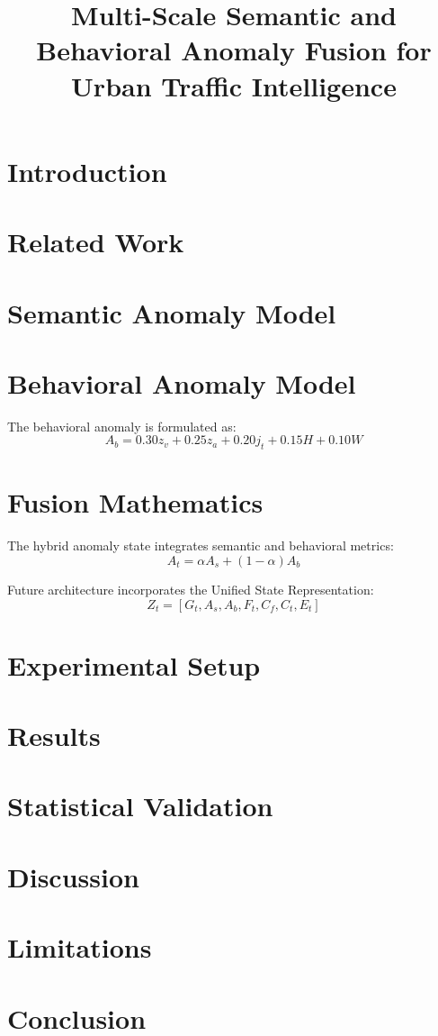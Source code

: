 \documentclass{article}
\title{Multi-Scale Semantic and Behavioral Anomaly Fusion for Urban Traffic Intelligence}
\begin{document}
\maketitle

\begin{abstract}
\end{abstract}

\section{Introduction}
\section{Related Work}

\section{Semantic Anomaly Model}
\section{Behavioral Anomaly Model}
The behavioral anomaly is formulated as:
$$A_b = 0.30z_v + 0.25z_a + 0.20j_t + 0.15H + 0.10W$$

\section{Fusion Mathematics}
The hybrid anomaly state integrates semantic and behavioral metrics:
$$A_t = \alpha A_s + (1-\alpha)A_b$$

Future architecture incorporates the Unified State Representation:
$$Z_t = [G_t, A_s, A_b, F_t, C_f, C_t, E_t]$$

\section{Experimental Setup}
\section{Results}
\section{Statistical Validation}
\section{Discussion}
\section{Limitations}
\section{Conclusion}
\end{document}
